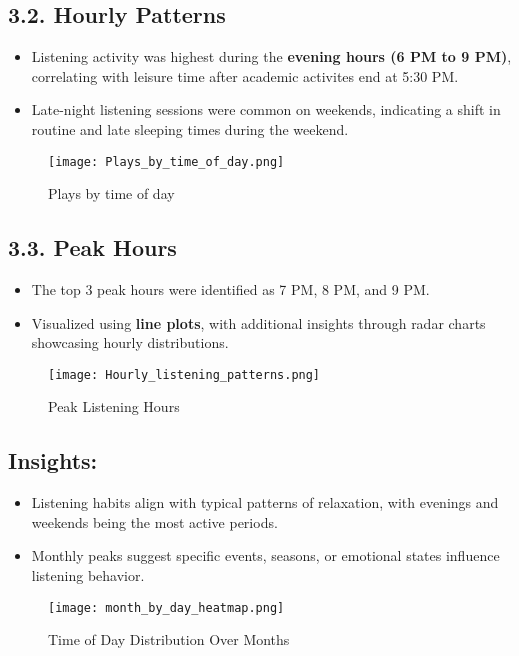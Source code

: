 \documentclass[12pt]{article}
\begin{document}
\begin{itemize}
\subsection*{3.2. Hourly Patterns}
\begin{itemize}
    \item Listening activity was highest during the \textbf{evening hours (6 PM to 9 PM)}, correlating with leisure time after academic activites end at 5:30 PM.
    \item Late-night listening sessions were common on weekends, indicating a shift in routine and late sleeping times during the weekend.
\end{itemize}
\begin{figure}[H]
    \centering
    \texttt{[image: Plays\_by\_time\_of\_day.png]}
    \caption{Plays by time of day}
    \label{fig:enter-label}
\end{figure}

\subsection*{3.3. Peak Hours}
\begin{itemize}
    \item The top 3 peak hours were identified as 7 PM, 8 PM, and 9 PM.
    \item Visualized using \textbf{line plots}, with additional insights through radar charts showcasing hourly distributions.
\end{itemize}
\begin{figure}[H]
    \centering
    \texttt{[image: Hourly\_listening\_patterns.png]}
    \caption{Peak Listening Hours}
    \label{fig:enter-label}
\end{figure}
\subsection*{Insights:}
\begin{itemize}
    \item Listening habits align with typical patterns of relaxation, with evenings and weekends being the most active periods.
    \item Monthly peaks suggest specific events, seasons, or emotional states influence listening behavior.
\end{itemize}
\begin{figure}[H]
    \centering
    \texttt{[image: month\_by\_day\_heatmap.png]}
    \caption{Time of Day Distribution Over Months}
    \label{fig:enter-label}
\end{figure}

\end{itemize}
\end{document}
